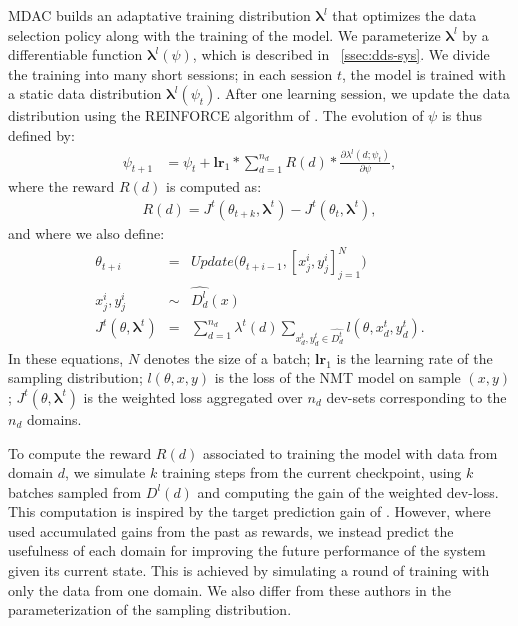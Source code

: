 \documentclass[11pt]{article}
\newcommand{\fyDone}[1]{\done[FY]\Todo[FY:]{\textcolor{orange}{#1}}}
\newcommand{\vlambda}{\ensuremath{\boldsymbol\lambda}\xspace} %
\begin{document}
MDAC builds an adaptative training distribution $\vlambda^{l}$ that optimizes the data selection policy along with the training of the model. We parameterize $\vlambda^{l}$ by a differentiable function $\vlambda^l(\psi)$, which is described in \textsection~\ref{ssec:dds-sys}. We divide the training into many short sessions; in each session $t$, the model is trained with a static data distribution $\vlambda^{l}(\psi_t)$. After one learning session, we update the data distribution using the REINFORCE algorithm of . The evolution of $\psi$ is thus defined by:\fyDone{$t$ is both for time, and for test - change into $\tau$?}
\begin{align*}
\psi_{t+1} &= \psi_t + \mathbf{lr}_{1} * \displaystyle{\mathop{\sum}_{d=1}^{n_d}} R(d) * \frac{\partial \lambda^l(d;\psi_t)}{\partial \psi},
\end{align*}
\begingroup
\allowdisplaybreaks
where the reward $R(d)$ is computed as:
\begin{align}
  R(d) = J^t(\theta_{t+k},\vlambda^t) - J^t(\theta_t,\vlambda^t), \label{eq:reward}
\end{align}
and where we also define:
\begin{equation}
\begin{array}{rcl}
\theta_{t+i} &=& Update\big(\theta_{t+i-1},[x^i_j,y^i_j]_{j=1}^N\big) \\ \nonumber
x^i_j, y^i_j &\sim& \widehat{D^l_d}(x) \\
J^t(\theta,\vlambda^t) &=& \displaystyle{\mathop{\sum}_{d=1}^{n_d}}\lambda^t(d)\displaystyle{\mathop{\sum}_{x^t_d,y^t_d \in \widehat{D^t_d}}} l(\theta,x^t_d,y^t_d).
\end{array}
\end{equation}
\endgroup
In these equations, $N$ denotes the size of a batch; $\mathbf{lr}_{1}$ is the learning rate of the sampling distribution; $l(\theta,x,y)$ is the loss of the NMT model on sample $(x,y)$; $J^t(\theta,\vlambda^t)$ is the weighted loss aggregated over $n_d$ dev-sets corresponding to the $n_d$ domains.

To compute the reward $R(d)$ associated to training the model with data from domain $d$, we simulate $k$ training steps from the current checkpoint, using $k$ batches sampled from $D^l(d)$ and computing the gain of the weighted dev-loss. This computation is inspired by the target prediction gain of . However, where  used accumulated gains from the past as rewards, we instead predict the usefulness of each domain for improving the future performance of the system given its current state. This is achieved by simulating a round of training with only the data from one domain. We also differ from these authors in the parameterization of the sampling distribution.
\end{document}
